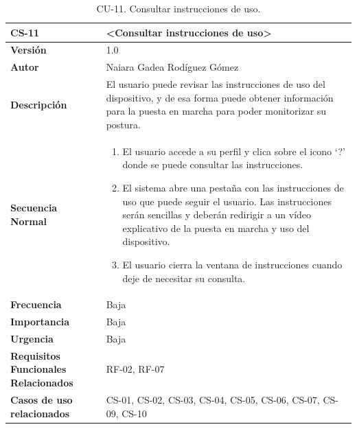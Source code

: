 \begin{table}[h!]
\centering
\begin{tabular}{ |m{3cm}|m{11cm}|  } 
\hline
\cellcolor[HTML]{B9E3F0}\textbf{CS-11} & \cellcolor[HTML]{B9E3F0}\textbf{<Consultar instrucciones de uso>}\\

\hline
\cellcolor[HTML]{EFEFEF}\textbf{Versión}             & 1.0  \\
\hline
\cellcolor[HTML]{EFEFEF}\textbf{Autor}                & Naiara Gadea Rodíguez Gómez\\
\hline
\cellcolor[HTML]{EFEFEF}\textbf{Descripción}                & {El usuario puede revisar las instrucciones de uso del dispositivo, y de esa forma puede obtener información para la puesta en marcha para poder monitorizar su postura.}\\
\hline
\cellcolor[HTML]{EFEFEF}\textbf{Secuencia \newline Normal}                &                 
        \begin{enumerate}
			\def\labelenumi{\arabic{enumi}.}
			\tightlist
			\item El usuario accede a su perfil y clica sobre el icono ‘?’ donde se puede consultar las instrucciones.
			\item El sistema abre una pestaña con las instrucciones de uso que puede seguir el usuario. Las instrucciones serán sencillas y deberán redirigir a un vídeo explicativo de la puesta en marcha y uso del dispositivo.
                \item El usuario cierra la ventana de instrucciones cuando deje de necesitar su consulta. 
		\end{enumerate}\\
\hline
\cellcolor[HTML]{EFEFEF}\textbf{Frecuencia}                & Baja\\
\hline
\cellcolor[HTML]{EFEFEF}\textbf{Importancia}                & Baja\\
\hline
\cellcolor[HTML]{EFEFEF}\textbf{Urgencia}                & Baja\\
\hline
\cellcolor[HTML]{EFEFEF}\textbf{Requisitos Funcionales Relacionados}                & {RF-02, RF-07}\\
\hline
\cellcolor[HTML]{EFEFEF}\textbf{Casos de uso relacionados}                & {CS-01, CS-02, CS-03, CS-04, CS-05, CS-06, CS-07, CS-09, CS-10 }\\
\hline
\end{tabular}
\caption{CU-11. Consultar instrucciones de uso.}
\end{table}


